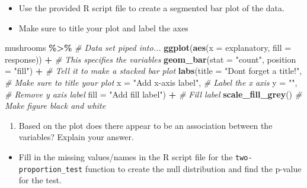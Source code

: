 \documentclass[
]{report}
\newenvironment{Shaded}{\begin{snugshade}}{\end{snugshade}}
\newcommand{\AttributeTok}[1]{\textcolor[rgb]{0.13,0.29,0.53}{#1}}
\newcommand{\CommentTok}[1]{\textcolor[rgb]{0.56,0.35,0.01}{\textit{#1}}}
\newcommand{\FunctionTok}[1]{\textcolor[rgb]{0.13,0.29,0.53}{\textbf{#1}}}
\newcommand{\NormalTok}[1]{#1}
\newcommand{\SpecialCharTok}[1]{\textcolor[rgb]{0.81,0.36,0.00}{\textbf{#1}}}
\newcommand{\StringTok}[1]{\textcolor[rgb]{0.31,0.60,0.02}{#1}}
\providecommand{\tightlist}{%
  \setlength{\itemsep}{0pt}\setlength{\parskip}{0pt}}
\begin{document}
\vspace{0.8in}

\begin{itemize}
\item
  Use the provided R script file to create a segmented bar plot of the data.
\item
  Make sure to title your plot and label the axes
\end{itemize}

\begin{Shaded}
\begin{Highlighting}[]
\NormalTok{mushrooms }\SpecialCharTok{\%\textgreater{}\%} \CommentTok{\# Data set piped into...}
  \FunctionTok{ggplot}\NormalTok{(}\FunctionTok{aes}\NormalTok{(}\AttributeTok{x =}\NormalTok{ explanatory, }\AttributeTok{fill =}\NormalTok{ response)) }\SpecialCharTok{+}   \CommentTok{\# This specifies the variables}
  \FunctionTok{geom\_bar}\NormalTok{(}\AttributeTok{stat =} \StringTok{"count"}\NormalTok{, }\AttributeTok{position =} \StringTok{"fill"}\NormalTok{) }\SpecialCharTok{+}  \CommentTok{\# Tell it to make a stacked bar plot}
  \FunctionTok{labs}\NormalTok{(}\AttributeTok{title =} \StringTok{"Don\textquotesingle{}t forget a title!"}\NormalTok{,  }\CommentTok{\# Make sure to title your plot}
       \AttributeTok{x =} \StringTok{"Add x{-}axis label"}\NormalTok{,   }\CommentTok{\# Label the x axis}
       \AttributeTok{y =} \StringTok{""}\NormalTok{, }\CommentTok{\# Remove y axis label}
       \AttributeTok{fill =} \StringTok{"Add fill label"}\NormalTok{) }\SpecialCharTok{+}  \CommentTok{\# Fill label}
  \FunctionTok{scale\_fill\_grey}\NormalTok{()  }\CommentTok{\# Make figure black and white}
\end{Highlighting}
\end{Shaded}

\begin{enumerate}
\def\labelenumi{\arabic{enumi}.}
\setcounter{enumi}{6}
\tightlist
\item
  Based on the plot does there appear to be an association between the variables? Explain your answer.
\end{enumerate}

\newpage

\begin{itemize}
\tightlist
\item
  Fill in the missing values/names in the R script file for the \texttt{two-proportion\_test} function to create the null distribution and find the p-value for the test.
\end{itemize}
\end{document}
